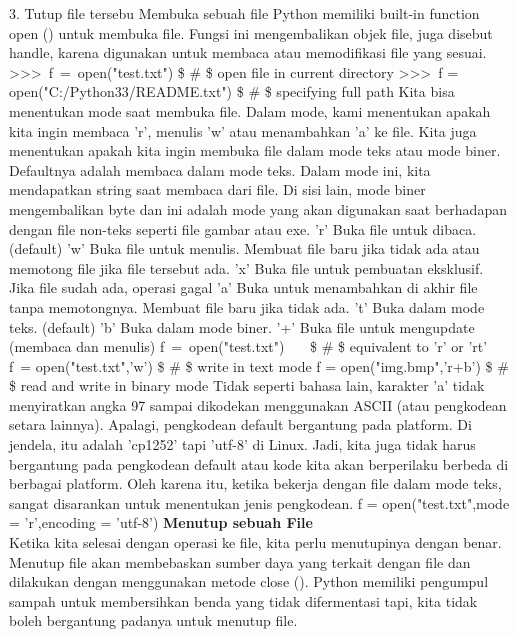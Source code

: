 3. \hspace*{0.5in} Tutup file tersebu 
Membuka sebuah file  
Python memiliki built-in function open () untuk membuka file. Fungsi ini mengembalikan objek file, juga disebut handle, karena digunakan untuk membaca atau memodifikasi file yang sesuai.  
>>>~f~=~open("test.txt")     \$  \#  \$ open file in current directory  
>>>~f = open("C:/Python33/README.txt")   \$  \#  \$ specifying full path 
Kita bisa menentukan mode saat membuka file. Dalam mode, kami menentukan apakah kita ingin membaca 'r', menulis 'w' atau menambahkan 'a' ke file. Kita juga menentukan apakah kita ingin membuka file dalam mode teks atau mode biner. Defaultnya adalah membaca dalam mode teks. Dalam mode ini, kita mendapatkan string saat membaca dari file. Di sisi lain, mode biner mengembalikan byte dan ini adalah mode yang akan digunakan saat berhadapan dengan file non-teks seperti file gambar atau exe.  
'r' \hspace*{0.5in}  
Buka file untuk dibaca. (default)
'w' \hspace*{0.5in}  
Buka file untuk menulis. Membuat file baru jika tidak ada atau memotong file jika file tersebut ada.  
'x' \hspace*{0.5in}   
Buka file untuk pembuatan eksklusif. Jika file sudah ada, operasi gagal 
'a' \hspace*{0.5in}   
Buka untuk menambahkan di akhir file tanpa memotongnya. Membuat file baru jika tidak ada. 
't' \hspace*{0.5in}   
Buka dalam mode teks. (default)  
'b' 
Buka dalam mode biner.  
'+'  
Buka file untuk mengupdate (membaca dan menulis)  
f~=~open("test.txt")~~~    \$  \#  \$ equivalent to 'r' or 'rt'  
f~= open("test.txt",'w')   \$  \#  \$ write in text mode  
f = open("img.bmp",'r+b')  \$  \#  \$ read and write in binary mode  
Tidak seperti bahasa lain, karakter 'a' tidak menyiratkan angka 97 sampai dikodekan menggunakan ASCII (atau pengkodean setara lainnya). Apalagi, pengkodean default bergantung pada platform. Di jendela, itu adalah 'cp1252' tapi 'utf-8' di Linux. Jadi, kita juga tidak harus bergantung pada pengkodean default atau kode kita akan berperilaku berbeda di berbagai platform. Oleh karena itu, ketika bekerja dengan file dalam mode teks, sangat disarankan untuk menentukan jenis pengkodean.  
f = open("test.txt",mode = 'r',encoding = 'utf-8')  
{\fontsize{14pt}{14pt}\selectfont \textbf{Menutup sebuah File} \\} 
Ketika kita selesai dengan operasi ke file, kita perlu menutupinya dengan benar. Menutup file akan membebaskan sumber daya yang terkait dengan file dan dilakukan dengan menggunakan metode close (). Python memiliki pengumpul sampah untuk membersihkan benda yang tidak difermentasi tapi, kita tidak boleh bergantung padanya untuk menutup file. 
